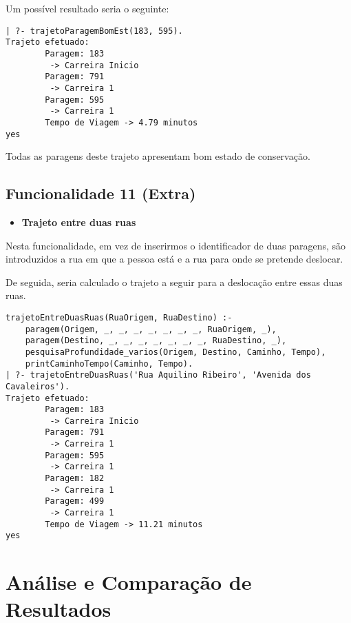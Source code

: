\documentclass[a4paper,12pt]{report}
\begin{document}
Um possível resultado seria o seguinte:

\begin{verbatim}
| ?- trajetoParagemBomEst(183, 595).
Trajeto efetuado: 
        Paragem: 183
         -> Carreira Inicio
        Paragem: 791
         -> Carreira 1
        Paragem: 595
         -> Carreira 1
        Tempo de Viagem -> 4.79 minutos
yes
\end{verbatim}  

Todas as paragens deste trajeto apresentam bom estado de conservação.

\vspace{10cm}

\subsection{Funcionalidade 11 (Extra)}
\begin{itemize}
    \item \textbf{Trajeto entre duas ruas}
\end{itemize}

\par Nesta funcionalidade, em vez de inserirmos o identificador de duas paragens, são introduzidos a rua em que a pessoa está e a rua para onde se pretende deslocar. 
\par De seguida, seria calculado o trajeto a seguir para a deslocação entre essas duas ruas.

\begin{verbatim}
trajetoEntreDuasRuas(RuaOrigem, RuaDestino) :-
    paragem(Origem, _, _, _, _, _, _, _, RuaOrigem, _),
    paragem(Destino, _, _, _, _, _, _, _, RuaDestino, _),
    pesquisaProfundidade_varios(Origem, Destino, Caminho, Tempo),
    printCaminhoTempo(Caminho, Tempo).
| ?- trajetoEntreDuasRuas('Rua Aquilino Ribeiro', 'Avenida dos Cavaleiros').
Trajeto efetuado: 
        Paragem: 183
         -> Carreira Inicio
        Paragem: 791
         -> Carreira 1
        Paragem: 595
         -> Carreira 1
        Paragem: 182
         -> Carreira 1
        Paragem: 499
         -> Carreira 1
        Tempo de Viagem -> 11.21 minutos
yes
\end{verbatim}  


\vspace{30cm}
\section{Análise e Comparação de Resultados}
\end{document}
